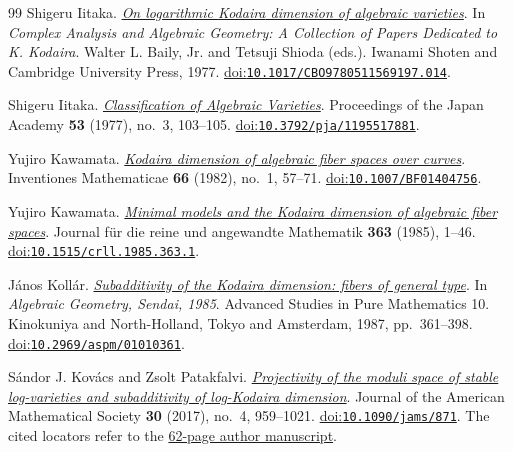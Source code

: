 \begin{thebibliography}{99}
Shigeru Iitaka.
\emph{\href{https://doi.org/10.1017/CBO9780511569197.014}{On logarithmic {Kodaira} dimension of algebraic varieties}}.
In \emph{Complex Analysis and Algebraic Geometry: A Collection of Papers Dedicated to {K. Kodaira}}.
Walter L. Baily, Jr. and Tetsuji Shioda (eds.).
Iwanami Shoten and Cambridge University Press, 1977.
\href{https://doi.org/10.1017/CBO9780511569197.014}{doi:\nolinkurl{10.1017/CBO9780511569197.014}}.

Shigeru Iitaka.
\emph{\href{https://www.jstage.jst.go.jp/article/pjab1945/53/3/53_3_103/_pdf}{Classification of Algebraic Varieties}}.
Proceedings of the Japan Academy \textbf{53} (1977), no.~3, 103--105.
\href{https://doi.org/10.3792/pja/1195517881}{doi:\nolinkurl{10.3792/pja/1195517881}}.

Yujiro Kawamata.
\emph{\href{https://link.springer.com/article/10.1007/BF01404756}{{Kodaira} dimension of algebraic fiber spaces over curves}}.
Inventiones Mathematicae \textbf{66} (1982), no.~1, 57--71.
\href{https://doi.org/10.1007/BF01404756}{doi:\nolinkurl{10.1007/BF01404756}}.

Yujiro Kawamata.
\emph{\href{https://doi.org/10.1515/crll.1985.363.1}{Minimal models and the {Kodaira} dimension of algebraic fiber spaces}}.
Journal f{\"u}r die reine und angewandte Mathematik \textbf{363} (1985), 1--46.
\href{https://doi.org/10.1515/crll.1985.363.1}{doi:\nolinkurl{10.1515/crll.1985.363.1}}.

J{\'a}nos Koll{\'a}r.
\emph{\href{https://doi.org/10.2969/aspm/01010361}{Subadditivity of the {Kodaira} dimension: fibers of general type}}.
In \emph{Algebraic Geometry, Sendai, 1985}.
Advanced Studies in Pure Mathematics 10.
Kinokuniya and North-Holland, Tokyo and Amsterdam, 1987, pp.~361--398.
\href{https://doi.org/10.2969/aspm/01010361}{doi:\nolinkurl{10.2969/aspm/01010361}}.

S{\'a}ndor J. Kov{\'a}cs and Zsolt Patakfalvi.
\emph{\href{https://sites.math.washington.edu/~kovacs/current/papers/Kovacs_Patakfalvi__Projectivity.pdf}{Projectivity of the moduli space of stable log-varieties and subadditivity of log-{Kodaira} dimension}}.
Journal of the American Mathematical Society \textbf{30} (2017), no.~4, 959--1021.
\href{https://doi.org/10.1090/jams/871}{doi:\nolinkurl{10.1090/jams/871}}.
The cited locators refer to the \href{https://sites.math.washington.edu/~kovacs/current/papers/Kovacs_Patakfalvi__Projectivity.pdf}{62-page author manuscript}.


\end{thebibliography}
